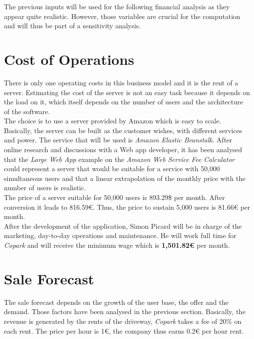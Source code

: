 \documentclass[12pt,a4paper,oneside]{book}
\newcommand{\bp}{\textit{Copark}}
\begin{document}
The previous inputs will be used for the following financial analysis as they appear quite realistic. However, those variables are crucial for the computation and will thus be part of a sensitivity analysis.


\section{Cost of Operations}
There is only one operating costs in this business model and it is the rent of a server. Estimating the cost of the server is not an easy task because it depends on the load on it, which itself depends on the number of users and the architecture of the software.\\

The choice is to use a server provided by Amazon which is easy to scale. Basically, the server can be built as the customer wishes, with different services and power. The service that will be used is \textit{Amazon Elastic Beanstalk}. After online research and discussions with a Web app developer, it has been analysed that the \textit{Large Web App} example on the \textit{Amazon Web Service Fee Calculator} could represent a server that would be suitable for a service with 50,000 simultaneous users and that a linear extrapolation of the monthly price with the number of users is realistic.\cite{itwlois,qaws,hsaws}\\

The price of a server suitable for 50,000 users is 893.29\$ per month.\cite{awsclwa} After conversion it leads to 816.59\euro{}. Thus, the price to sustain 5,000 users is 81.66\euro{} per month.\\

After the development of the application, Simon Picard will be in charge of the marketing, day-to-day operations and maintenance. He will work full time for \bp{} and will receive the minimum wage which is \textbf{1,501.82\euro{}} per month.\cite{eurostatmw}\\


\section{Sale Forecast}
\label{sf}

The sale forecast depends on the growth of the user base, the offer and the demand. Those factors have been analysed in the previous section. Basically, the revenue is generated by the rents of the driveway, \bp{} takes a fee of 20\% on each rent. The price per hour is 1\euro{}, the company thus earns 0.2\euro{} per hour rent.\\
\end{document}
